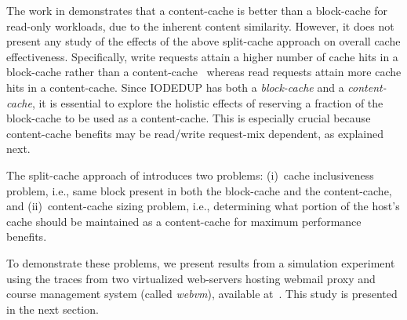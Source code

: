 The work in \cite{iodedup} demonstrates that a content-cache 
is better than a block-cache for read-only workloads,
due to the inherent content similarity.
However, it does not present any study of the effects of the above
split-cache approach on overall cache effectiveness.
Specifically,
write requests attain a higher number of cache hits in a block-cache rather
than a content-cache~\cite{iodedup} whereas read requests attain more 
cache hits in a content-cache. 
Since IODEDUP has both a \textit{block-cache} and a \textit{content-cache}, 
it is essential to explore the holistic effects of reserving a fraction of the
block-cache to be used as a content-cache. This is especially
crucial because content-cache benefits may be read/write 
request-mix dependent, as explained next.

The split-cache approach of \cite{iodedup} introduces two problems:
(i)~cache inclusiveness problem, i.e.,
same block present in both the block-cache and the content-cache, and
(ii)~content-cache sizing problem, i.e., determining what portion of 
the host's cache should be maintained as a content-cache
for maximum performance benefits.

To demonstrate these problems, we present results from a simulation experiment
using the traces from two virtualized web-servers hosting 
webmail proxy and course management system (called \textit{webvm}),
available at~\cite{iodedup-online}. This study is presented in the next 
section.

